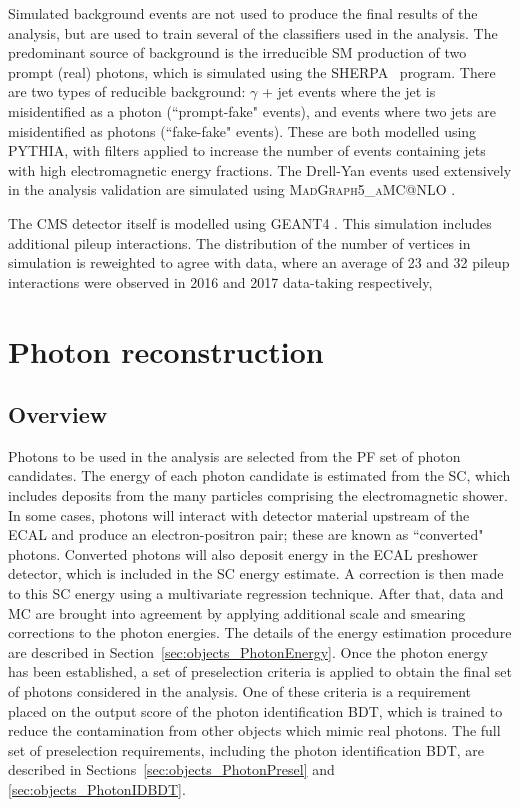 Simulated background events are not used to produce the final results of the analysis, 
but are used to train several of the classifiers used in the analysis.
The predominant source of background is the irreducible SM production of two prompt (real) photons, 
which is simulated using the \textsc{SHERPA}~\cite{sherpa} program. %
There are two types of reducible background: $\gamma$ + jet events where the jet is misidentified as a photon (``prompt-fake" events), 
and events where two jets are misidentified as photons (``fake-fake" events).
These are both modelled using \textsc{PYTHIA}, 
with filters applied to increase the number of events containing jets with high electromagnetic energy fractions.
The Drell-Yan events used extensively in the analysis validation are simulated using \textsc{MadGraph5_{}aMC@NLO} \cite{Madgraph}. 

The CMS detector itself is modelled using \textsc{GEANT4} \cite{Geant4}.
This simulation includes additional pileup interactions.
The distribution of the number of vertices in simulation is reweighted to agree with data, 
where an average of 23 and 32 pileup interactions were observed in 2016 and 2017 data-taking respectively, 

\section{Photon reconstruction}
\subsection{Overview}

Photons to be used in the \Hgg analysis are selected from the PF set of photon candidates.
The energy of each photon candidate is estimated from the SC, 
which includes deposits from the many particles comprising the electromagnetic shower.
In some cases, photons will interact with detector material upstream of the ECAL 
and produce an electron-positron pair; these are known as ``converted" photons.
Converted photons will also deposit energy in the ECAL preshower detector, 
which is included in the SC energy estimate.
A correction is then made to this SC energy using a multivariate regression technique.
After that, data and MC are brought into agreement by applying additional scale and smearing corrections to the photon energies.
The details of the energy estimation procedure are described in Section~\ref{sec:objects_PhotonEnergy}.
Once the photon energy has been established, 
a set of preselection criteria is applied to obtain the final set of photons considered in the analysis.
One of these criteria is a requirement placed on the output score of the photon identification BDT, 
which is trained to reduce the contamination from other objects which mimic real photons.
The full set of preselection requirements, including the photon identification BDT, 
are described in Sections~\ref{sec:objects_PhotonPresel} and \ref{sec:objects_PhotonIDBDT}.

